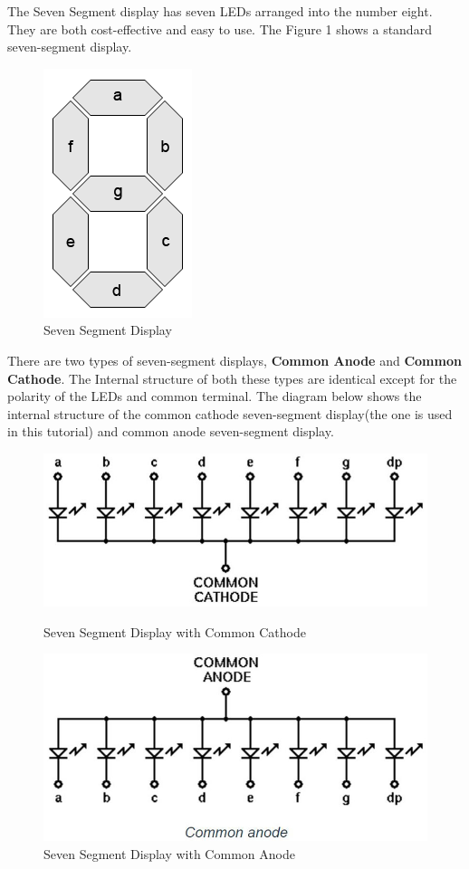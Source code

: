 \documentclass[12pt,singleside,a4paper]{article}
\begin{document}
\noindent The Seven Segment display has seven LEDs arranged into the number eight. They are both cost-effective and easy to use. The Figure 1 shows a standard seven-segment display.
\begin{center}
\begin{figure}[H]
    \centering
    \includegraphics[scale=0.5]{Display/SevenLEDs.png}
    \caption{ Seven Segment Display }
\end{figure}
\end{center}
\noindent There are two types of seven-segment displays, \textbf{Common Anode} and \textbf{Common Cathode}. The Internal structure of both these types are identical except for the polarity of the LEDs and common terminal. The diagram below shows the internal structure of the common cathode seven-segment display(the one is used in this tutorial) and common anode seven-segment display.

\begin{figure}[H]
\centering
    \includegraphics[scale=0.2]{Circuit/commoncathode.jpg}
    \caption{ Seven Segment Display with Common Cathode }
    \includegraphics[scale=0.2]{Circuit/commonannode.jpg}
    \caption{ Seven Segment Display with Common Anode }
\end{figure}
\end{document}
